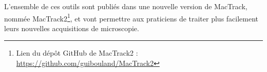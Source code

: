 \documentclass[a4paper,12pt]{report}
\begin{document}
L'ensemble de ces outils sont publiés dans une nouvelle version de MacTrack, nommée MacTrack2\footnote{Lien du dépôt GitHub de MacTrack2 : \url{https://github.com/guibouland/MacTrack2}}, et vont permettre aux praticiens de traiter plus facilement leurs nouvelles acquisitions de microscopie.

%
\end{document}
